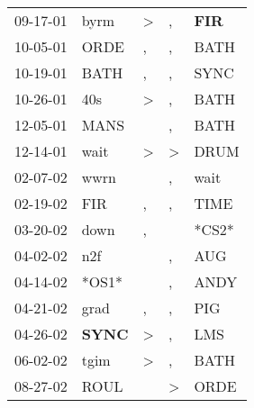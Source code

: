 \begin{supertabular}{p{0.07\textwidth}p{0.06\textwidth}p{0.02\textwidth}p{0.02\textwidth}p{0.06\textwidth}}
          09-17-01\textsuperscript{} &           byrm\textsuperscript{} &  \textgreater &             , &  \textbf{FIR\textsuperscript{}} \\
          10-05-01\textsuperscript{} &           ORDE\textsuperscript{} &             , &             , &          BATH\textsuperscript{} \\
          10-19-01\textsuperscript{} &           BATH\textsuperscript{} &             , &             , &          SYNC\textsuperscript{} \\
          10-26-01\textsuperscript{} &            40s\textsuperscript{} &  \textgreater &             , &          BATH\textsuperscript{} \\
          12-05-01\textsuperscript{} &           MANS\textsuperscript{} &               &             , &          BATH\textsuperscript{} \\
          12-14-01\textsuperscript{} &           wait\textsuperscript{} &  \textgreater &  \textgreater &          DRUM\textsuperscript{} \\
          02-07-02\textsuperscript{} &           wwrn\textsuperscript{} &               &             , &          wait\textsuperscript{} \\
          02-19-02\textsuperscript{} &            FIR\textsuperscript{} &             , &             , &          TIME\textsuperscript{} \\
          03-20-02\textsuperscript{} &           down\textsuperscript{} &             , &               &                           *CS2* \\
          04-02-02\textsuperscript{} &            n2f\textsuperscript{} &               &             , &           AUG\textsuperscript{} \\
          04-14-02\textsuperscript{} &                            *OS1* &               &             , &          ANDY\textsuperscript{} \\
          04-21-02\textsuperscript{} &           grad\textsuperscript{} &             , &             , &           PIG\textsuperscript{} \\
          04-26-02\textsuperscript{} &  \textbf{SYNC\textsuperscript{}} &  \textgreater &             , &           LMS\textsuperscript{} \\
          06-02-02\textsuperscript{} &           tgim\textsuperscript{} &  \textgreater &             , &          BATH\textsuperscript{} \\
          08-27-02\textsuperscript{} &           ROUL\textsuperscript{} &               &  \textgreater &          ORDE\textsuperscript{} \\

\end{supertabular}
